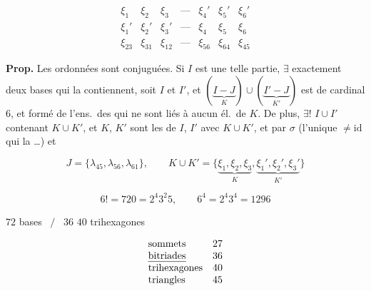 \documentclass[11pt,a4paper]{article}
\begin{document}

\[
\begin{matrix}
\xi_1 & \xi_2 & \xi_3 & \text{---} & \xi_4' & \xi_5' & \xi_6'\\
\xi_1' & \xi_2' & \xi_3' & \text{---} & \xi_4 & \xi_5 & \xi_6\\
\xi_{23} & \xi_{31} & \xi_{12} & \text{---} & \xi_{56} & \xi_{64} & \xi_{45}
\end{matrix}
\]


\textbf{Prop.} Les   ordonnées sont conjuguées. Si $I$ est une telle partie, $\exists$ exactement deux bases qui la contiennent, soit $I$ et $I'$, et $(\underbrace{I - J}_{K}) \cup (\underbrace{I' - J}_{K'})$ est de cardinal $6$, et formé de l'ens.\ des  qui ne sont liés à aucun él.\ de $K$. De plus, $\exists !$  $I \cup I'$ contenant $K \cup K'$, et $K$, $K'$ sont  les  de $I$, $I'$ avec $K \cup K'$,  et \struck{\ill{}}  par $\sigma$ (l'unique  $\neq \mathrm{id}$ qui  \struck{\ill{}}  la  \ldots) et 

\[
J = \{\lambda_{45}, \lambda_{56}, \lambda_{61}\}, \qquad
K \cup K' = \{\underbrace{\xi_1, \xi_2, \xi_3}_{K}, \underbrace{\xi_1', \xi_2', \xi_3'}_{K'}\}
\]

\[
6! = 720 = 2^4 3^2 5, \qquad 6^4 = 2^4 3^4 = 1296
\]

$72$ bases \ $\big/$ \ $36$  \quad $40$ trihexagones


\[
\begin{array}{ll}
\text{sommets} & 27\\
\text{\uncertain{bitriades}} & 36\\
\text{trihexagones} & 40\\
\text{triangles} & 45
\end{array}
\]
\end{document}
